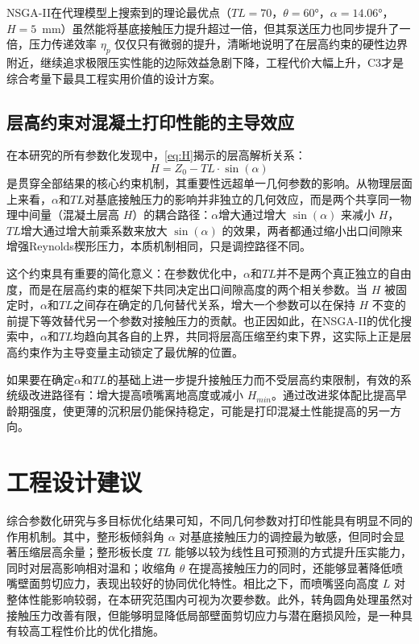 NSGA-II在代理模型上搜索到的理论最优点（$TL=70$，$\theta=60°$，$\alpha=14.06°$，$H=5$~mm）虽然能将基底接触压力提升超过一倍，但其泵送压力也同步提升了一倍，压力传递效率 $\eta_p$ 仅仅只有微弱的提升，清晰地说明了在层高约束的硬性边界附近，继续追求极限压实性能的边际效益急剧下降，工程代价大幅上升，C3才是综合考量下最具工程实用价值的设计方案。

\subsection{层高约束对混凝土打印性能的主导效应}

在本研究的所有参数化发现中，\cref{eq:H}揭示的层高解析关系：
\begin{equation}
  H = Z_0 - TL \cdot \sin(\alpha) \tag{2.1}
\end{equation}
是贯穿全部结果的核心约束机制，其重要性远超单一几何参数的影响。从物理层面上来看，$\alpha$和$TL$对基底接触压力的影响并非独立的几何效应，而是两个共享同一物理中间量（混凝土层高 $H$）的耦合路径：$\alpha$增大通过增大 $\sin(\alpha)$ 来减小 $H$，$TL$增大通过增大前乘系数来放大 $\sin(\alpha)$ 的效果，两者都通过缩小出口间隙来增强Reynolds楔形压力，本质机制相同，只是调控路径不同。

这个约束具有重要的简化意义：在参数优化中，$\alpha$和$TL$并不是两个真正独立的自由度，而是在层高约束的框架下共同决定出口间隙高度的两个相关参数。当 $H$ 被固定时，$\alpha$和$TL$之间存在确定的几何替代关系，增大一个参数可以在保持 $H$ 不变的前提下等效替代另一个参数对接触压力的贡献。也正因如此，在NSGA-II的优化搜索中，$\alpha$和$TL$均趋向其各自的上界，共同将层高压缩至约束下界，这实际上正是层高约束作为主导变量主动锁定了最优解的位置。

如果要在确定$\alpha$和$TL$的基础上进一步提升接触压力而不受层高约束限制，有效的系统级改进路径有：增大提高喷嘴离地高度或减小 $H_{min}$。通过改进浆体配比提高早龄期强度，使更薄的沉积层仍能保持稳定，可能是打印混凝土性能提高的另一方向。

\section{工程设计建议}

综合参数化研究与多目标优化结果可知，不同几何参数对打印性能具有明显不同的作用机制。其中，整形板倾斜角 $\alpha$ 对基底接触压力的调控最为敏感，但同时会显著压缩层高余量；整形板长度 $TL$ 能够以较为线性且可预测的方式提升压实能力，同时对层高影响相对温和；收缩角 $\theta$ 在提高接触压力的同时，还能够显著降低喷嘴壁面剪切应力，表现出较好的协同优化特性。相比之下，而喷嘴竖向高度 $L$ 对整体性能影响较弱，在本研究范围内可视为次要参数。此外，转角圆角处理虽然对接触压力改善有限，但能够明显降低局部壁面剪切应力与潜在磨损风险，是一种具有较高工程性价比的优化措施。

